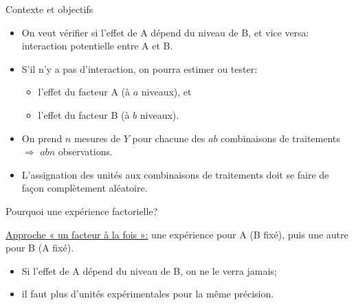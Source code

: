 \documentclass{BeamerTemplate}
\begin{document}
\begin{frame}[t]{Contexte et objectifs}

\begin{itemize}\itemsep3mm
  \item On veut vérifier si l'effet de A dépend du niveau de B, et vice versa:
  \alert{interaction} potentielle entre A et B.
  \item<2-> S'il n'y a pas d'interaction, on pourra estimer ou tester:
  \begin{itemize}
    \item l'effet du facteur A (à $a$ niveaux), et
    \item l'effet du facteur B (à $b$ niveaux).
  \end{itemize}
  \item<3-> On prend $n$ mesures de $Y$ pour chacune des $ab$ combinaisons de
  traitements $\Rightarrow$ $abn$ observations.
  \item<4-> L'assignation des unités aux combinaisons de traitements doit se faire
  de façon \alert{complètement aléatoire}.
\end{itemize}

\end{frame}

\begin{frame}[t]{Pourquoi une expérience factorielle?}

\small
\underline{Approche « un facteur à la fois »:} une expérience pour A (B fixé), puis
une autre pour B (A fixé).
\begin{itemize}
  \item Si l'effet de A dépend du niveau de B, on ne le verra \alert{jamais};
  \item il faut plus d'unités expérimentales pour la même précision.
\end{itemize}

\medskip
{}


\end{frame}
\end{document}
